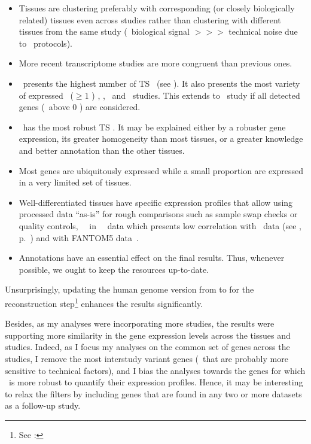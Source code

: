 \begin{itemize}[nosep,topsep=0pt]
        \item Tissues are clustering preferably with corresponding
            (or closely biologically related) tissues even across studies
            rather than clustering with different tissues from the same study
            (\ie\ biological signal $>>>$ technical noise due to \Rnaseq\ protocols).
        \item More recent transcriptome studies are more congruent than previous ones.
        \item \testis\ presents the highest number of \gls{TS} \pcgs\
            (see ).
            It also presents the most variety of expressed \pcgs\ ($≥1$ \FPKM)
            \castle, \brawand, \ibm\ and \uhlen\ studies.
            This extends to \gtex\ study if all detected genes (\ie\ above 0 \FPKM)
            are considered.
        \item \liver\ has the most robust \gls{TS} \pcgs.
            It may be explained either by a robuster gene expression,
            its greater homogeneity than most tissues,
            or a greater knowledge and better annotation
            than the other tissues.
        \item Most genes are ubiquitously expressed while
          a small proportion are expressed in a very limited set of tissues.
        \item Well-differentiated tissues have specific expression profiles
            that allow using processed data \enquote{as-is} for rough comparisons
            such as sample swap checks
            or quality controls, \eg\ \salivary\ in \uhlen\ \etal\ data which
            presents low correlation with
            \gtex\ data (see ,
            p.~\pageref{fig:SamedistribPearsCorr}) and with
            FANTOM5 data~.
        \item Annotations have an essential effect on the final results.
              Thus, whenever possible, we ought to keep the resources up-to-date.
\end{itemize}


\vspace{2.5mm}
Unsurprisingly,
updating the human genome version from  to 
for the reconstruction
step\footnote{See : }
enhances the results significantly.\mybr\

Besides, as my analyses were incorporating more studies,
the results were supporting more similarity in the gene expression levels across
the tissues and studies.
Indeed, as I focus my analyses on the common set of genes across the studies,
I remove the most interstudy variant genes
(\ie\ that are probably more sensitive to technical factors), and
I bias the analyses towards the genes
for which \Rnaseq\ is more robust to quantify their expression profiles.
Hence, it may be interesting to relax the filters by including genes
that are found in any two or more datasets as a follow-up study.\mybr\

